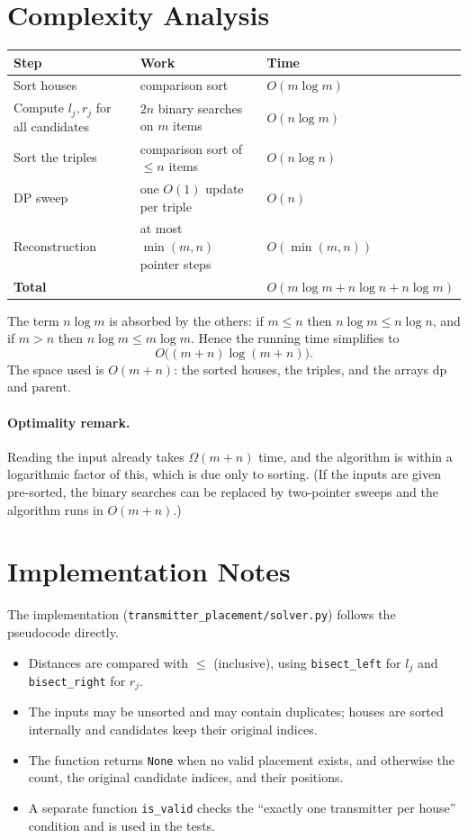 \documentclass[11pt,a4paper]{article}
\theoremstyle{definition}
\begin{document}
\section{Complexity Analysis}

\begin{center}
\begin{tabular}{p{4.2cm}p{4.6cm}l}
\toprule
Step & Work & Time \\
\midrule
Sort houses & comparison sort & $O(m\log m)$ \\
Compute $l_j,r_j$ for all candidates & $2n$ binary searches on $m$ items & $O(n\log m)$ \\
Sort the triples & comparison sort of $\le n$ items & $O(n\log n)$ \\
DP sweep & one $O(1)$ update per triple & $O(n)$ \\
Reconstruction & at most $\min(m,n)$ pointer steps & $O(\min(m,n))$ \\
\midrule
\textbf{Total} & & $O(m\log m + n\log n + n\log m)$ \\
\bottomrule
\end{tabular}
\end{center}

The term $n\log m$ is absorbed by the others: if $m\le n$ then $n\log m\le n\log n$, and if $m>n$ then $n\log m \le m\log m$.
Hence the running time simplifies to
\[
  O\bigl((m+n)\log(m+n)\bigr).
\]
The space used is $O(m+n)$: the sorted houses, the triples, and the arrays $\mathrm{dp}$ and $\mathrm{parent}$.

\paragraph{Optimality remark.} Reading the input already takes $\Omega(m+n)$ time, and the algorithm is within a logarithmic factor of this, which is due only to sorting.
(If the inputs are given pre-sorted, the binary searches can be replaced by two-pointer sweeps and the algorithm runs in $O(m+n)$.)

\section{Implementation Notes}

The implementation (\texttt{transmitter\_placement/solver.py}) follows the pseudocode directly.
\begin{itemize}[nosep]
  \item Distances are compared with $\le$ (inclusive), using \texttt{bisect\_left} for $l_j$ and \texttt{bisect\_right} for $r_j$.
  \item The inputs may be unsorted and may contain duplicates; houses are sorted internally and candidates keep their original indices.
  \item The function returns \texttt{None} when no valid placement exists, and otherwise the count, the original candidate indices, and their positions.
  \item A separate function \texttt{is\_valid} checks the ``exactly one transmitter per house'' condition and is used in the tests.
\end{itemize}
\end{document}
